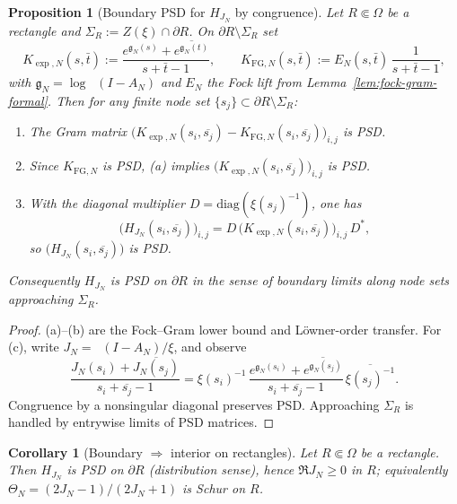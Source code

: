 \documentclass[11pt]{article}
\newtheorem{proposition}[theorem]{Proposition}
\newtheorem{corollary}[theorem]{Corollary}
\theoremstyle{definition}
\theoremstyle{remark}
\DeclareMathOperator{\dettwo}{det_2}
\begin{document}
\begin{proposition}[Boundary PSD for $H_{J_N}$ by congruence]\label{prop:boundary-psd-fixed}
Let $R\Subset\Omega$ be a rectangle and $\Sigma_R:=Z(\xi)\cap\partial R$. On $\partial R\setminus\Sigma_R$ set
\[
K_{\exp,N}(s,\bar t):=\frac{e^{\mathfrak g_N(s)}+\overline{e^{\mathfrak g_N(t)}}}{s+\bar t-1},\qquad 
K_{\mathrm{FG},N}(s,\bar t):=E_N(s,\bar t)\,\frac{1}{s+\bar t-1},
\]
with $\mathfrak g_N=\log\dettwo(I-A_N)$ and $E_N$ the Fock lift from Lemma~\ref{lem:fock-gram-formal}. Then for any finite node set $\{s_j\}\subset\partial R\setminus\Sigma_R$:
\begin{enumerate}
\item[\textup{(a)}] The Gram matrix $\big(K_{\exp,N}(s_i,\overline{s_j})-K_{\mathrm{FG},N}(s_i,\overline{s_j})\big)_{i,j}$ is PSD.
\item[\textup{(b)}] Since $K_{\mathrm{FG},N}$ is PSD, (a) implies $\big(K_{\exp,N}(s_i,\overline{s_j})\big)_{i,j}$ is PSD.
\item[\textup{(c)}] With the diagonal multiplier $D=\mathrm{diag}(\xi(s_j)^{-1})$, one has
\[
\Big(H_{J_N}(s_i,\overline{s_j})\Big)_{i,j}=D\,\Big(K_{\exp,N}(s_i,\overline{s_j})\Big)_{i,j}\,D^{*},
\]
so $\big(H_{J_N}(s_i,\overline{s_j})\big)$ is PSD.
\end{enumerate}
Consequently $H_{J_N}$ is PSD on $\partial R$ in the sense of boundary limits along node sets approaching $\Sigma_R$.
\end{proposition}
\begin{proof}
(a)–(b) are the Fock–Gram lower bound and Löwner-order transfer. For (c), write $J_N=\dettwo(I-A_N)/\xi$, and observe
\[\frac{J_N(s_i)+\overline{J_N(s_j)}}{s_i+\overline{s_j}-1}=\xi(s_i)^{-1}\,\frac{e^{\mathfrak g_N(s_i)}+\overline{e^{\mathfrak g_N(s_j)}}}{s_i+\overline{s_j}-1}\,\overline{\xi(s_j)^{-1}}.\]
Congruence by a nonsingular diagonal preserves PSD. Approaching $\Sigma_R$ is handled by entrywise limits of PSD matrices.
\end{proof}
\begin{corollary}[Boundary $\Rightarrow$ interior on rectangles]\label{cor:bdry-to-int}
Let $R\Subset\Omega$ be a rectangle. Then $H_{J_N}$ is PSD on $\partial R$ (distribution sense), hence $\Re J_N\ge 0$ in $R$; equivalently $\Theta_N=(2J_N-1)/(2J_N+1)$ is Schur on $R$.
\end{corollary}
\end{document}
